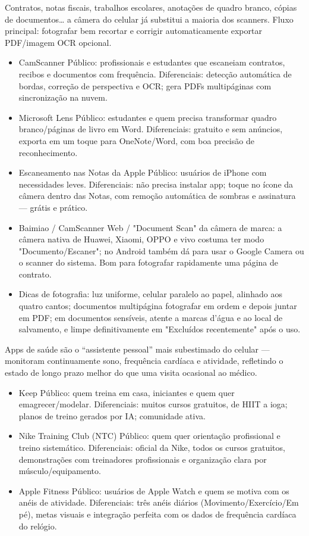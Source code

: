 Contratos, notas fiscais, trabalhos escolares, anotações de quadro branco, cópias de documentos… a câmera do celular já substitui a maioria dos scanners. Fluxo principal: fotografar bem recortar e corrigir automaticamente exportar PDF/imagem OCR opcional.

\begin{itemize}
  \item CamScanner Público: profissionais e estudantes que escaneiam contratos, recibos e documentos com frequência. Diferenciais: detecção automática de bordas, correção de perspectiva e OCR; gera PDFs multipáginas com sincronização na nuvem.
  \item Microsoft Lens Público: estudantes e quem precisa transformar quadro branco/páginas de livro em Word. Diferenciais: gratuito e sem anúncios, exporta em um toque para OneNote/Word, com boa precisão de reconhecimento.
  \item Escaneamento nas Notas da Apple Público: usuários de iPhone com necessidades leves. Diferenciais: não precisa instalar app; toque no ícone da câmera dentro das Notas, com remoção automática de sombras e assinatura — grátis e prático.
  \item Baimiao / CamScanner Web / "Document Scan" da câmera de marca: a câmera nativa de Huawei, Xiaomi, OPPO e vivo costuma ter modo "Documento/Escaner"; no Android também dá para usar o Google Camera ou o scanner do sistema. Bom para fotografar rapidamente uma página de contrato.
  \item Dicas de fotografia: luz uniforme, celular paralelo ao papel, alinhado aos quatro cantos; documentos multipágina fotografar em ordem e depois juntar em PDF; em documentos sensíveis, atente a marcas d'água e ao local de salvamento, e limpe definitivamente em "Excluídos recentemente" após o uso.
\end{itemize}


Apps de saúde são o “assistente pessoal” mais subestimado do celular — monitoram continuamente sono, frequência cardíaca e atividade, refletindo o estado de longo prazo melhor do que uma visita ocasional ao médico.


\begin{itemize}
  \item Keep Público: quem treina em casa, iniciantes e quem quer emagrecer/modelar. Diferenciais: muitos cursos gratuitos, de HIIT a ioga; planos de treino gerados por IA; comunidade ativa.
  \item Nike Training Club (NTC) Público: quem quer orientação profissional e treino sistemático. Diferenciais: oficial da Nike, todos os cursos gratuitos, demonstrações com treinadores profissionais e organização clara por músculo/equipamento.
  \item Apple Fitness Público: usuários de Apple Watch e quem se motiva com os anéis de atividade. Diferenciais: três anéis diários (Movimento/Exercício/Em pé), metas visuais e integração perfeita com os dados de frequência cardíaca do relógio.
\end{itemize}

